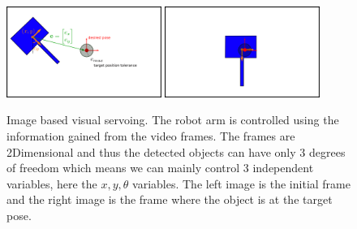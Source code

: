 \begin{center}
\begin{figure}[H]
\centering
\includegraphics[width=0.45\textwidth]{images/visual_servo_start.png}
\includegraphics[width=0.45\textwidth]{images/visual_servo_end.png}\\
\caption{Image based visual servoing. The robot arm is controlled using the information gained from the video frames. The frames are 2Dimensional and thus 
the detected objects can have only 3 degrees of freedom which means we can mainly control 3 independent variables, here the $x,y,θ$ variables. The left image 
is the initial frame and the right image is the frame where the object is at the target pose.}
\end{figure}
\end{center}
